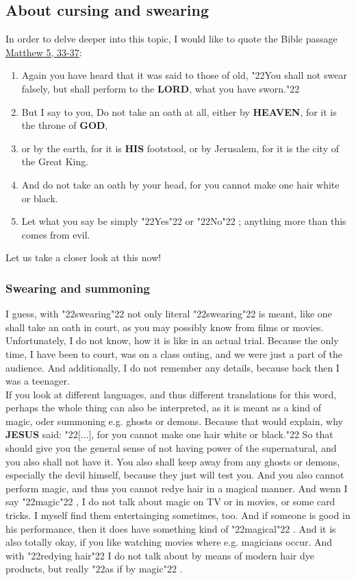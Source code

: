 \documentclass[10pt,a5paper]{article}
\newcommand{\God}[0]{\textbf{GOD}}
\newcommand{\Heaven}[0]{\textbf{HEAVEN}}
\newcommand{\His}[0]{\textbf{HIS}}
\newcommand{\Jesus}[0]{\textbf{JESUS}}
\newcommand{\Lord}[0]{\textbf{LORD}}
\newcommand{\q}[1]{\char"22{#1}\char"22 }
\begin{document}
	\subsection{About cursing and swearing}
		In order to delve deeper into this topic,
		I would like to quote the Bible passage \href{https://www.die-bibel.de/bibeln/online-bibeln/lesen/ESV/MAT.5/Matthew-5}{Matthew 5, 33-37}:
		\begin{enumerate}[noitemsep,start=33]
			\item	Again you have heard that it was said to those of old,
					\q{You shall not swear falsely,
					but shall perform to the {\Lord},
					what you have sworn.}
			\item	But I say to you,
					Do not take an oath at all,
					either by {\Heaven},
					for it is the throne of {\God},
			\item	or by the earth,
					for it is {\His} footstool,
					or by Jerusalem,
					for it is the city of the Great King.
			\item	And do not take an oath by your head,
					for you cannot make one hair white or black.
			\item	Let what you say be simply \q{Yes} or \q{No};
					anything more than this comes from evil.
		\end{enumerate}
		Let us take a closer look at this now!

	\subsubsection{Swearing and summoning}
		I guess,
		with \q{swearing} not only literal \q{swearing} is meant,
		like one shall take an oath in court,
		as you may possibly know from films or movies.
		Unfortunately,
		I do not know,
		how it is like in an actual trial.
		Because the only time,
		I have been to court,
		was on a class outing,
		and we were just a part of the audience.
		And additionally,
		I do not remember any details,
		because back then I was a teenager.
		\\
		If you look at different languages,
		and thus different translations for this word,
		perhaps the whole thing can also be interpreted,
		as it is meant as a kind of magic,
		oder summoning e.g. ghosts or demons.
		Because that would explain,
		why {\Jesus} said:
		\q{[...],
		for you cannot make one hair white or black.}
		So that should give you the general sense of not having power of the supernatural,
		and you also shall not have it.
		You also shall keep away from any ghosts or demons,
		especially the devil himself,
		because they just will test you.
		And you also cannot perform magic,
		and thus you cannot redye hair in a magical manner.
		And wenn I say \q{magic},
		I do not talk about magic on TV or in movies,
		or some card tricks.
		I myself find them entertainging sometimes, too.
		And if someone is good in his performance,
		then it does have something kind of \q{magical}.
		And it is also totally okay,
		if you like watching movies where e.g. magicians occur.
		And with \q{redying hair} I do not talk about by means of modern hair dye products,
		but really \q{as if by magic}.
\end{document}
